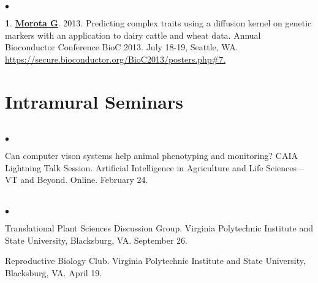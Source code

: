 \documentclass[margin,line,10pt]{res}
\newenvironment{list2}{
  \begin{list}{$\bullet$}{%
      \setlength{\itemsep}{0in}
      \setlength{\parsep}{0in} \setlength{\parskip}{0in}
      \setlength{\topsep}{0in} \setlength{\partopsep}{0in} 
      \setlength{\leftmargin}{0.2in}}}{\end{list}}
\begin{document}
\begin{resume}
\begin{list2}
\vspace{0.5cm}

\item  [{\bf 1}.] \textbf{\underline{Morota G}}. 2013. Predicting complex traits using a diffusion kernel on genetic markers with an application to dairy cattle and wheat data. Annual Bioconductor Conference BioC 2013. July 18-19, Seattle, WA. \textcolor{blue}{\href{https://secure.bioconductor.org/BioC2013/posters.php\#7}{https://secure.bioconductor.org/BioC2013/posters.php\#7. } }  
\end{list2}











\vspace{0.5cm}
\section{\sc Intramural Seminars}
\vspace{1cm}

\section{}
\begin{list2}
  \item Can computer vison systems help animal phenotyping and monitoring? CAIA Lightning Talk Session. Artificial Intelligence in Agriculture and Life Sciences – VT and Beyond. Online. February 24. 
\end{list2}  

\section{}
\begin{list2}
  \item Translational Plant Sciences Discussion Group. Virginia Polytechnic Institute and State University, Blacksburg, VA. September 26. 
  \vspace{0.5cm}
\item Reproductive Biology Club. Virginia Polytechnic Institute and State University, Blacksburg, VA. April 19. 
\end{list2}  


\end{resume}
\end{document}
